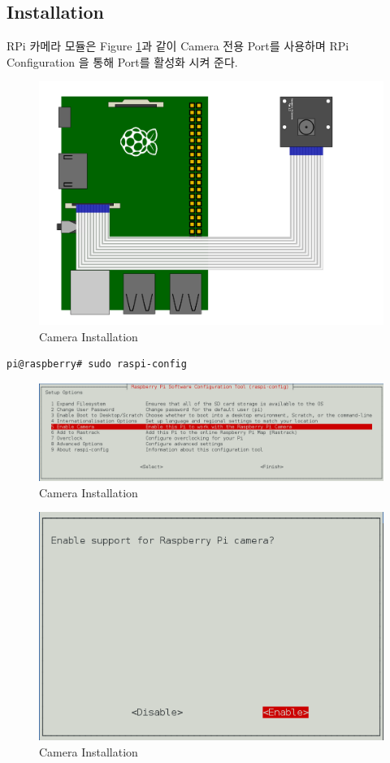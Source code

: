 \documentclass[11pt
  , a4paper
  , article
  , oneside
]{memoir}
\begin{document}
\subsection{Installation}
RPi 카메라 모듈은 Figure \ref{fig:ist_cam}과 같이 Camera 전용 Port를 사용하며 RPi Configuration
을 통해 Port를 활성화 시켜 준다.
\begin{figure}[h]
\centering
\includegraphics[width=1\textwidth]{./images/raspberry/pi_camera_setting.png}
\caption{Camera Installation}
\label{fig:ist_cam}
\end{figure}
\begin{lstlisting}[style=termstyle]
pi@raspberry# sudo raspi-config
\end{lstlisting}
\begin{figure}
\centering
\includegraphics[width=1\textwidth]{./images/raspberry/enable_camera.png}
\caption{Camera Installation}
\label{fig:en_cam}
\end{figure}
\begin{figure}[!htb]
\centering
\includegraphics[width=1\textwidth]{./images/raspberry/enable_camera_sel.png}
\caption{Camera Installation}
\label{fig:sel_en_cam}
\end{figure}
\end{document}
